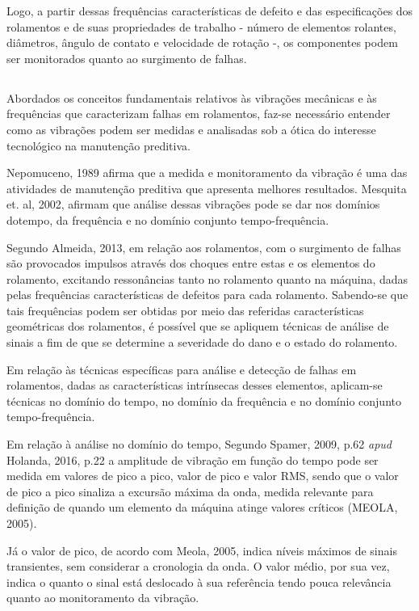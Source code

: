 \documentclass[
	12pt,				
	oneside,			
	a4paper,			
	english,			
	brazil,			
	]{abntex2ppgsi}
\begin{document}
Logo, a partir dessas frequências características de defeito e das especificações dos rolamentos e de suas propriedades de trabalho - número de elementos rolantes, diâmetros, ângulo de contato e velocidade de rotação -, os componentes podem ser monitorados quanto ao surgimento de falhas.  

\subsection{}

Abordados os conceitos  fundamentais relativos às vibrações mecânicas e às frequências que caracterizam falhas em rolamentos, faz-se necessário entender como as vibrações podem ser medidas e analisadas sob a ótica do interesse tecnológico na manutenção preditiva. 

Nepomuceno, 1989 afirma que a medida e monitoramento da vibração é uma das atividades de manutenção preditiva que apresenta melhores resultados. Mesquita et. al, 2002, afirmam que análise dessas vibrações pode se dar nos domínios dotempo, da frequência e no domínio conjunto tempo-frequência.

Segundo Almeida, 2013, em relação aos rolamentos, com o surgimento de falhas são provocados impulsos através dos choques entre estas e os elementos do rolamento, excitando ressonâncias tanto no rolamento quanto na máquina, dadas pelas frequências características de defeitos para cada rolamento. Sabendo-se que tais frequências podem ser obtidas por meio das referidas características geométricas dos rolamentos, é possível que se apliquem técnicas de análise de sinais a fim de que se determine a severidade do dano e o estado do rolamento.

Em relação às técnicas específicas para análise e detecção de falhas em rolamentos, dadas as características intrínsecas desses elementos, aplicam-se técnicas no domínio do tempo, no domínio da frequência e no domínio conjunto tempo-frequência. 

Em relação à análise no domínio do tempo, Segundo Spamer, 2009, p.62 \textit{apud} Holanda, 2016, p.22 a amplitude de vibração em função do tempo pode ser medida em valores de pico a pico, valor de pico e valor RMS, sendo que o valor de pico a pico sinaliza a excursão máxima da onda, medida relevante para definição de quando um elemento da máquina atinge valores críticos (MEOLA, 2005). 

Já o valor de pico, de acordo com Meola, 2005, indica níveis máximos de sinais transientes, sem considerar a cronologia da onda. O valor médio, por sua vez, indica o quanto o sinal está deslocado à sua referência tendo pouca relevância quanto ao monitoramento da vibração. 
\end{document}
